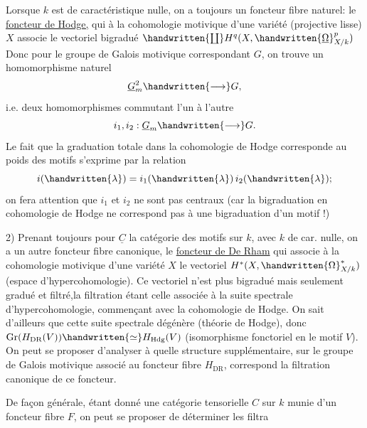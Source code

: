
Lorsque $k$ est de caractéristique nulle, on a toujours un foncteur fibre naturel: le \uline{foncteur de Hodge,} qui à la cohomologie motivique d'une variété (projective lisse) $X$ associe le vectoriel bigradué $\handwritten{\coprod}H^q(X,\handwritten{\underline{\Omega}}^p_{X/k})$ Donc pour le groupe de Galois motivique correspondant $G$, on trouve un homomorphisme naturel
\[
\underline{G}_m^2\handwritten{\longrightarrow}G,
\]
i.e. deux homomorphismes commutant l'un à l'autre
\[
i_1,i_2:\underline{G}_m\handwritten{\longrightarrow}G.
\]
Le fait que la graduation totale dans la cohomologie de Hodge corresponde au poids des motifs s'exprime par la relation
\[
i(\handwritten{\lambda})=i_1(\handwritten{\lambda})\,i_2(\handwritten{\lambda});
\]
on fera attention que $i_1$ et $i_2$ ne sont pas centraux (car la bigraduation en cohomologie de Hodge ne correspond pas à une bigraduation d'un motif !)

2) Prenant toujours pour $\underline{C}$ la catégorie des motifs sur $k$, avec $k$ de car. nulle, on a un autre foncteur fibre canonique, le \uline{foncteur de De Rham} qui associe à la cohomologie motivique d'une variété $X$ le vectoriel $H^*(X,\handwritten{\Omega}^*_{X/k})$ (espace d'hypercohomologie). Ce vectoriel n'est plus bigradué mais seulement gradué et filtré,\handwritten{(}la filtration étant celle associée à la suite spectrale d'hypercohomologie, commençant avec la cohomologie de Hodge\handwritten{)}. On sait d'ailleurs que cette suite spectrale dégénère (théorie de Hodge), donc $\operatorname{Gr}(H_{\mathrm{DR}}(V))\handwritten{\simeq}H_{\mathrm{Hdg}}(V)$ (isomorphisme fonctoriel en le motif $V$). On peut se proposer d'analyser à quelle structure supplémentaire, sur le groupe de Galois motivique associé au foncteur fibre $H_{\mathrm{DR}}$, correspond la filtration canonique de ce foncteur.

De façon générale, étant donné une catégorie tensorielle $C$ sur $k$ munie d'un foncteur fibre $F$, on peut se proposer de déterminer les filtra%
